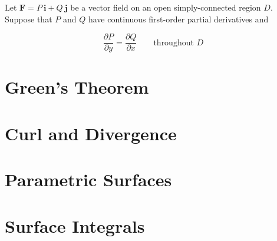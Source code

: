 \documentclass{article}
\begin{document}
\begin{center}
    Let $\mathbf{F} = P \ \mathbf{i} + Q \ \mathbf{j}$ be a vector field on an open simply-connected region $D$. Suppose that $P$ and $Q$ have continuous first-order partial derivatives and 

    \begin{equation*}
        \frac{\partial P}{ \partial y} = \frac{\partial Q}{ \partial x} \qquad \text{throughout } D 
    \end{equation*}
\end{center}


\newpage
\section{Green's Theorem}



\newpage
\section{Curl and Divergence}

\newpage
\section{Parametric Surfaces}

\newpage
\section{Surface Integrals}
\end{document}
